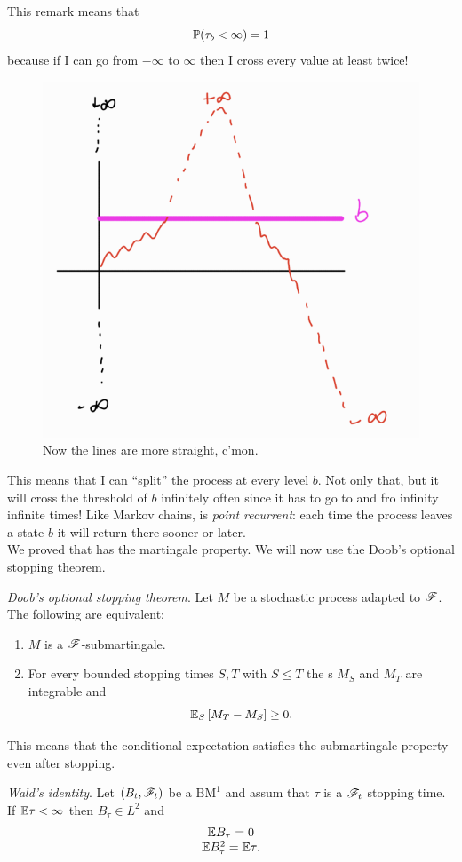 \documentclass[12pt]{report}
\begin{document}
	This remark means that 
\begin{equation*}
	\mathbb{P}(\tau_{b}<\infty)=1
\end{equation*}
because if I can go from $-\infty$ to $\infty$ then I cross every value at least twice!
\begin{figure}[h]
	\centering
	\includegraphics[width=0.6\linewidth]{img/screenshot018}
	\caption{Now the lines are more straight, c'mon.}
	\label{fig:screenshot018}
\end{figure}
This means that I can ``split'' the process at every level $b$. Not only that, but it will cross the threshold of $b$ infinitely often since it has to go to and fro infinity infinite times! Like Markov chains, \bwm{} is \emph{point recurrent}: each time the process leaves a state $b$ it will return there sooner or later.\\
We proved that \bwm{} has the martingale property. We will now use the Doob's optional stopping theorem.
\begin{theorem}
	\emph{Doob's optional stopping theorem}. Let $M$ be a stochastic process adapted to $\mathscr{F}$. The following are equivalent:
	\begin{enumerate}
		\item $M$ is a $\mathscr{F}$-submartingale.
		\item For every bounded stopping times $S,T$ with $S\leq T$ the \rv s $M_{S}$ and $M_{T}$ are integrable and 
		\begin{equation*}
			\mathbb{E}_{S}\left[M_{T}-M_{S}\right]\geq0.
		\end{equation*}
	\end{enumerate}
\end{theorem}
	This means that the conditional expectation satisfies the submartingale property even after stopping.
	\begin{theorem}
		\emph{Wald's identity}. Let $(B_{t},\mathscr{F}_{t})$ be a $\mathrm{BM}^{1}$ and assum that $\tau$ is a $\mathscr{F}_{t}$ stopping time. If $\mathbb{E}\tau<\infty$ then $B_{\tau}\in L^{2}$ and
		\begin{equation*}
			\begin{array}{c}
				\mathbb{E} B_{\tau}=0\\
				\mathbb{E} B_{\tau}^{2}=\mathbb{E}\tau.
			\end{array}
		\end{equation*}
	\end{theorem}
\end{document}

